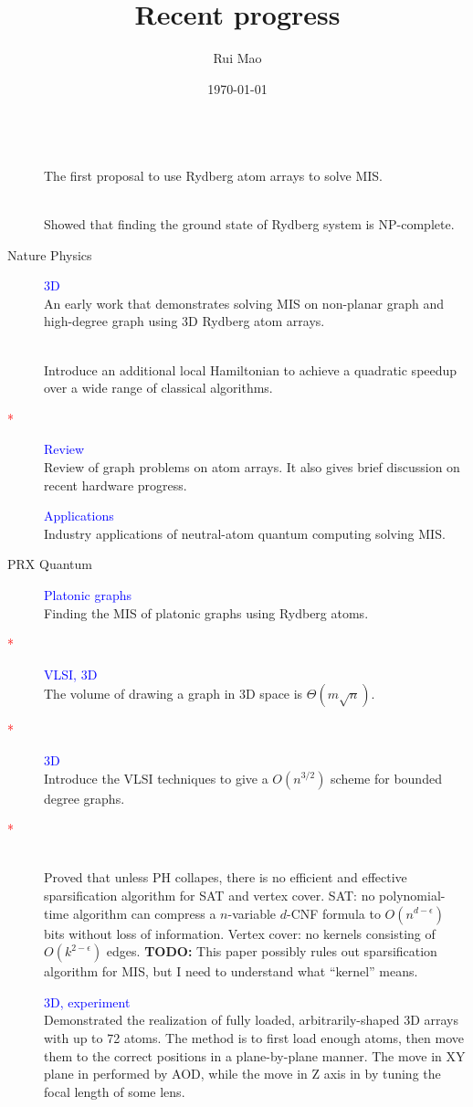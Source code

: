 \documentclass{article}
\title{Recent progress}
\author{Rui Mao}
\date{\today}
\newcommand{\DescItem}[2]{\item[{#1}] \hfill \textcolor{blue}{#2}\\}
\begin{document}
\maketitle

\begin{description}
	\DescItem{\cite{pichler2018quantum}}{}
	The first proposal to use Rydberg atom arrays to solve MIS.

	\DescItem{\cite{pichler2018computational}}{}
	Showed that finding the ground state of Rydberg system is NP-complete.

	\DescItem{\cite{kim2022rydberg} Nature Physics}{3D}
	An early work that demonstrates solving MIS on non-planar graph and high-degree graph using 3D Rydberg atom arrays.

	\DescItem{\cite{cain2023quantum}}{}
	Introduce an additional local Hamiltonian to achieve a quadratic speedup over a wide range of classical algorithms.

	\DescItem{\textcolor{red}{*}\cite{dalyac2024graph}}{Review}
	Review of graph problems on atom arrays.
	It also gives brief discussion on recent hardware progress.

	\DescItem{\cite{wurtz2024industry}}{Applications}
	Industry applications of neutral-atom quantum computing solving MIS.

	\DescItem{\cite{byun2022finding} PRX Quantum}{Platonic graphs}
	Finding the MIS of platonic graphs using Rydberg atoms.

	\DescItem{\textcolor{red}{*}\cite{biedl2006three}}{VLSI, 3D}
	The volume of drawing a graph in 3D space is $\Theta(m\sqrt{n})$.

	\DescItem{\textcolor{red}{*}\cite{dalyac2023exploring}}{3D}
	Introduce the VLSI techniques to give a $O(n^{3/2})$ scheme for bounded degree graphs.

	\DescItem{\textcolor{red}{*}\cite{dell2010satisfiability}}{}
	Proved that unless PH collapes, there is no efficient and effective sparsification algorithm for SAT and vertex cover.
	SAT: no polynomial-time algorithm can compress a $n$-variable $d$-CNF formula to $O(n^{d-\epsilon})$ bits without loss of information.
	Vertex cover: no kernels consisting of $O(k^{2-\epsilon})$ edges.
	\textbf{TODO:} This paper possibly rules out sparsification algorithm for MIS, but I need to understand what ``kernel'' means.

	\DescItem{\cite{barredo2018synthetic}}{3D, experiment}
	Demonstrated the realization of fully loaded, arbitrarily-shaped 3D arrays with up to 72 atoms.
	The method is to first load enough atoms, then move them to the correct positions in a plane-by-plane manner.
	The move in XY plane in performed by AOD, while the move in Z axis in by tuning the focal length of some lens.
\end{description}



\end{document}
